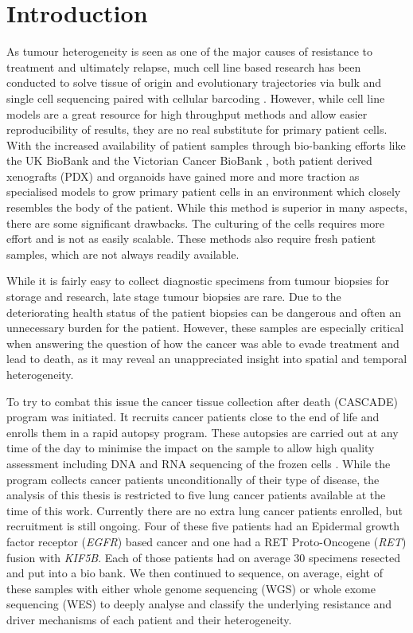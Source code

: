 \section{Introduction}
\label{cascade-sec:intro}

As tumour heterogeneity is seen as one of the major causes of resistance to treatment and ultimately relapse, much cell line based research has been conducted to solve tissue of origin and evolutionary trajectories via bulk and single cell sequencing paired with cellular barcoding \cite{Fennell2021,Penter2022}. However, while cell line models are a great resource for high throughput methods and allow easier reproducibility of results, they are no real substitute for primary patient cells. With the increased availability of patient samples through bio-banking efforts  like the UK BioBank \cite{Sudlow2015} and the Victorian Cancer BioBank \cite{CCV2006}, both patient derived xenografts (PDX) and organoids have gained more and more traction \cite{Yoshida2020} as specialised models to grow primary patient cells in an environment which closely resembles the body of the patient. While this method is superior in many aspects, there are some significant drawbacks. The culturing of the cells requires more effort and is not as easily scalable. These methods also require fresh patient samples, which are not always readily available.

While it is fairly easy to collect diagnostic specimens from tumour biopsies for storage and research, late stage tumour biopsies are rare. Due to the deteriorating health status of the patient biopsies can be dangerous and often an unnecessary burden for the patient. However, these samples are especially critical when answering the question of how the cancer was able to evade treatment and lead to death, as it may reveal an unappreciated insight into spatial and temporal heterogeneity.

To try to combat this issue the cancer tissue collection after death (CASCADE) program was initiated. It recruits cancer patients close to the end of life and enrolls them in a rapid autopsy program. These autopsies are carried out at any time of the day to minimise the impact on the sample to allow high quality assessment including DNA and RNA sequencing of the frozen cells \cite{Alsop2016}.
While the program collects cancer patients unconditionally of their type of disease, the analysis of this thesis is restricted to five lung cancer patients available at the time of this work. Currently there are no extra lung cancer patients enrolled, but recruitment is still ongoing. Four of these five patients had an Epidermal growth factor receptor (\textit{EGFR}) based cancer and one had a RET Proto-Oncogene (\textit{RET}) fusion with \textit{KIF5B}. Each of those patients had on average 30 specimens resected and put into a bio bank. We then continued to sequence, on average, eight of these samples with either whole genome sequencing (WGS) or whole exome sequencing (WES) to deeply analyse and classify the underlying resistance and driver mechanisms of each patient and their heterogeneity.

